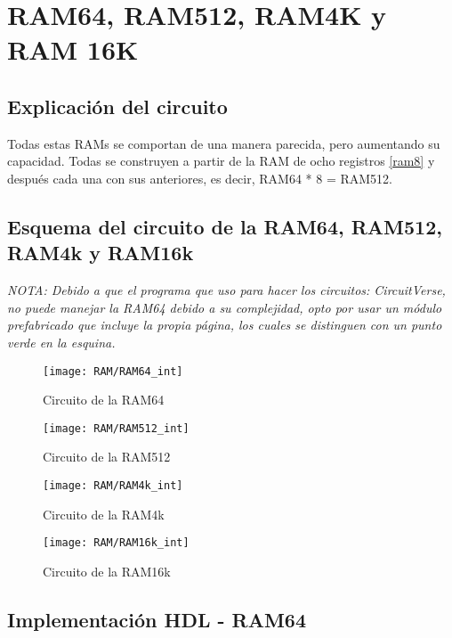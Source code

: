 \documentclass[12pt]{article}
\begin{document}
	\section{RAM64, RAM512, RAM4K y RAM 16K}
	\subsection{Explicación del circuito}
	Todas estas RAMs se comportan de una manera parecida, pero aumentando su capacidad. Todas se construyen a partir de la RAM de ocho registros \ref{ram8} y después cada una con sus anteriores, es decir, RAM64 * 8 = RAM512.

	\subsection{Esquema del circuito de la RAM64, RAM512, RAM4k y RAM16k}
	\footnotesize{\textit{NOTA: Debido a que el programa que uso para hacer los circuitos: CircuitVerse, no puede manejar la RAM64 debido a su complejidad, opto por usar un módulo prefabricado que incluye la propia página, los cuales se distinguen con un punto verde en la esquina.} }
	\begin{figure}[H]
	\centering
	\texttt{[image: RAM/RAM64\_int]}
	\caption{Circuito de la RAM64}
	\label{fig:ram64int}
	\end{figure}

	\begin{figure}[H]
	\centering
	\texttt{[image: RAM/RAM512\_int]}
	\caption{Circuito de la RAM512}
	\label{fig:ram512int}
	\end{figure}

	\begin{figure}[H]
	\centering
	\texttt{[image: RAM/RAM4k\_int]}
	\caption{Circuito de la RAM4k}
	\label{fig:ram4kint}
	\end{figure}

	\begin{figure}[H]
	\centering
	\texttt{[image: RAM/RAM16k\_int]}
	\caption{Circuito de la RAM16k}
	\label{fig:ram16kint}
	\end{figure}

	\subsection{Implementación HDL - RAM64}
\end{document}
